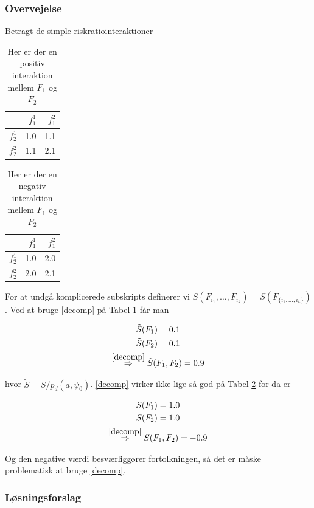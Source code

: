 \documentclass[a4paper, 12pt]{memoir}
\begin{document}
\subsubsection{Overvejelse}
Betragt de simple riskratiointeraktioner
\begin{table}[!ht]
\centering
\begin{tabular}{l | rr}
& $f_1^1$&$f_1^2$ \\
\midrule
$f_2^1$& 1.0& 1.1\\
$f_2^2$&1.1 & 2.1
\end{tabular}
\caption{Her er der en positiv interaktion mellem $F_1$ og $F_2$}\label{positiv_interaktion}
\end{table}

\begin{table}[!ht]
\centering
\begin{tabular}{l | rr}
& $f_1^1$&$f_1^2$ \\
\midrule
$f_2^1$& 1.0& 2.0\\
$f_2^2$&2.0 & 2.1
\end{tabular}
\caption{Her er der en negativ interaktion mellem $F_1$ og $F_2$}\label{negativ_interaktion}
\end{table}

For at undgå komplicerede subskripts definerer vi $S(F_{i_1}, \dots, F_{i_k})=S(F_{\{i_1,\dots, i_k\}})$. Ved at bruge \eqref{decomp} på Tabel \ref{positiv_interaktion} får man

\begin{gather*}
 \tilde S(F_1)=0.1\\
\tilde S(F_2)=0.1\\
\stackrel{\eqref{decomp}}{\Rightarrow} \tilde S(F_1,F_2)=0.9
\end{gather*}

hvor $\tilde S=S/p_d(a,\psi_0)$. \eqref{decomp}  virker ikke lige så god på Tabel \ref{negativ_interaktion} for da er

\begin{gather*}
S(F_1)=1.0\\
S(F_2)=1.0\\
\stackrel{\eqref{decomp}}{\Rightarrow}S(F_1,F_2)=-0.9
\end{gather*}

Og den negative værdi besværliggører fortolkningen, så det er måske problematisk at bruge \eqref{decomp}.

\subsubsection{Løsningsforslag}
\end{document}

